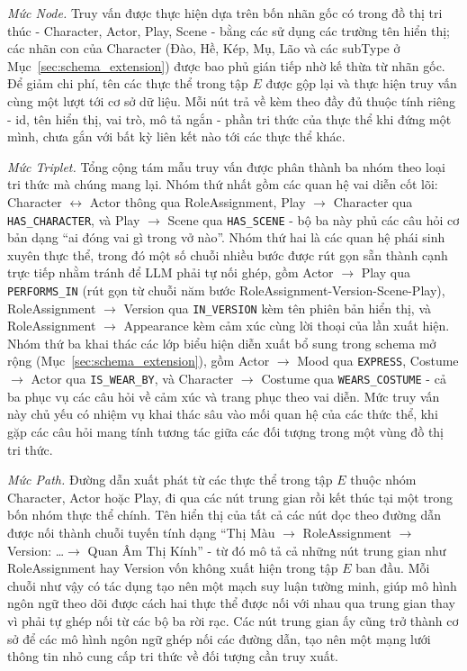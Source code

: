 \textit{Mức Node.} Truy vấn được thực hiện dựa trên bốn nhãn gốc có trong đồ thị tri thúc - Character, Actor, Play, Scene - bằng các sử dụng các trường tên hiển thị; các nhãn con của Character (Đào, Hề, Kép, Mụ, Lão và các subType ở Mục~\ref{sec:schema_extension}) được bao phủ gián tiếp nhờ kế thừa từ nhãn gốc. Để giảm chi phí, tên các thực thể trong tập $E$ được gộp lại và thực hiện truy vấn cùng một lượt tới cơ sở dữ liệu. Mỗi nút trả về kèm theo đầy đủ thuộc tính riêng - id, tên hiển thị, vai trò, mô tả ngắn - phần tri thức của thực thể khi đứng một mình, chưa gắn với bất kỳ liên kết nào tới các thực thể khác.

\textit{Mức Triplet.} Tổng cộng tám mẫu truy vấn được phân thành ba nhóm theo loại tri thức mà chúng mang lại. Nhóm thứ nhất gồm các quan hệ vai diễn cốt lõi: Character $\leftrightarrow$ Actor thông qua RoleAssignment, Play $\rightarrow$ Character qua \texttt{HAS\_CHARACTER}, và Play $\rightarrow$ Scene qua \texttt{HAS\_SCENE} - bộ ba này phủ các câu hỏi cơ bản dạng ``ai đóng vai gì trong vở nào''. Nhóm thứ hai là các quan hệ phái sinh xuyên thực thể, trong đó một số chuỗi nhiều bước được rút gọn sẵn thành cạnh trực tiếp nhằm tránh để LLM phải tự nối ghép, gồm Actor $\rightarrow$ Play qua \texttt{PERFORMS\_IN} (rút gọn từ chuỗi năm bước RoleAssignment-Version-Scene-Play), RoleAssignment $\rightarrow$ Version qua \texttt{IN\_VERSION} kèm tên phiên bản hiển thị, và RoleAssignment $\rightarrow$ Appearance kèm cảm xúc cùng lời thoại của lần xuất hiện. Nhóm thứ ba khai thác các lớp biểu hiện diễn xuất bổ sung trong schema mở rộng (Mục~\ref{sec:schema_extension}), gồm Actor $\rightarrow$ Mood qua \texttt{EXPRESS}, Costume $\rightarrow$ Actor qua \texttt{IS\_WEAR\_BY}, và Character $\rightarrow$ Costume qua \texttt{WEARS\_COSTUME} - cả ba phục vụ các câu hỏi về cảm xúc và trang phục theo vai diễn. Mức truy vấn này chủ yếu có nhiệm vụ khai thác sâu vào mối quan hệ của các thức thể, khi gặp các câu hỏi mang tính tương tác giữa các đối tượng trong một vùng đồ thị tri thức.

\textit{Mức Path.} Đường dẫn xuất phát từ các thực thể trong tập $E$ thuộc nhóm Character, Actor hoặc Play, đi qua các nút trung gian rồi kết thúc tại một trong bốn nhóm thực thể chính. Tên hiển thị của tất cả các nút dọc theo đường dẫn được nối thành chuỗi tuyến tính dạng ``Thị Màu $\rightarrow$ RoleAssignment $\rightarrow$ Version: \ldots $\rightarrow$ Quan Âm Thị Kính'' - từ đó mô tả cả những nút trung gian như RoleAssignment hay Version vốn không xuất hiện trong tập $E$ ban đầu. Mỗi chuỗi như vậy có tác dụng tạo nên một mạch suy luận tường minh, giúp mô hình ngôn ngữ theo dõi được cách hai thực thể được nối với nhau qua trung gian thay vì phải tự ghép nối từ các bộ ba rời rạc. Các nút trung gian ấy cũng trở thành cơ sở để các mô hình ngôn ngữ ghép nối các đường dẫn, tạo nên một mạng lưới thông tin nhỏ cung cấp tri thức về đối tượng cần truy xuất.

